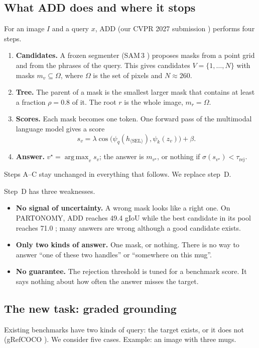 \documentclass[11pt,a4paper]{article}
\theoremstyle{definition}
\theoremstyle{remark}
\DeclareMathOperator*{\argmax}{arg\,max}
\begin{document}
\subsection{What ADD does and where it stops}
For an image $I$ and a query $x$, ADD (our CVPR 2027 submission \cite{add}) performs four steps.
\begin{enumerate}[label=\textbf{\Alph*.}]
\item \textbf{Candidates.} A frozen segmenter (SAM\,3 \cite{sam3}) proposes masks from a point grid and from the
phrases of the query. This gives candidates $V=\{1,\dots,N\}$ with masks $m_v\subseteq\Omega$, where $\Omega$ is the
set of pixels and $N\approx260$.
\item \textbf{Tree.} The parent of a mask is the smallest larger mask that contains at least a fraction
$\rho=0.8$ of it. The root $r$ is the whole image, $m_r=\Omega$.
\item \textbf{Scores.} Each mask becomes one token. One forward pass of the multimodal language model gives a score
\[
s_v=\lambda\cos\!\big(\psi_q(h_{\langle\mathrm{SEL}\rangle}),\psi_k(z_v)\big)+\beta .
\]
\item \textbf{Answer.} $v^\star=\argmax_v s_v$; the answer is $m_{v^\star}$, or nothing if $\sigma(s_{v^\star})<\tau_{\mathrm{rej}}$.
\end{enumerate}
Steps A--C stay unchanged in everything that follows. We replace step~D.

Step~D has three weaknesses.
\begin{itemize}
\item \textbf{No signal of uncertainty.} A wrong mask looks like a right one. On PARTONOMY, ADD reaches 49.4 gIoU
while the best candidate in its pool reaches 71.0 \cite{add}; many answers are wrong although a good candidate
exists.
\item \textbf{Only two kinds of answer.} One mask, or nothing. There is no way to answer ``one of these two
handles'' or ``somewhere on this mug''.
\item \textbf{No guarantee.} The rejection threshold is tuned for a benchmark score. It says nothing about how often
the answer misses the target.
\end{itemize}

\subsection{The new task: graded grounding}
\label{sec:task}
Existing benchmarks have two kinds of query: the target exists, or it does not (gRefCOCO \cite{gres}). We consider
five cases. Example: an image with three mugs.
\end{document}
